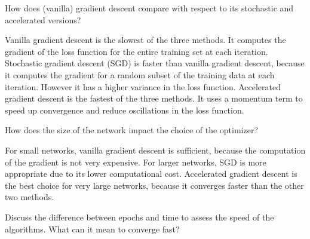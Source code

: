 \documentclass{article}
\newenvironment{task}[1]{
  \begin{tcolorbox}[
    colback=highlight!5!white,
    colframe=highlight,
    title={Task #1}
  ]
}{
  \end{tcolorbox}
}
\begin{document}
\begin{task}{1.3.2}
  How does (vanilla) gradient descent compare with respect to its stochastic and accelerated
  versions?
\end{task}

Vanilla gradient descent is the slowest of the three methods. It computes the gradient of the loss
function for the entire training set at each iteration. Stochastic gradient descent (SGD) is faster
than vanilla gradient descent, because it computes the gradient for a random subset of the training
data at each iteration. However it has a higher variance in the loss function. Accelerated gradient
descent is the fastest of the three methods. It uses a momentum term to speed up convergence and
reduce oscillations in the loss function.


\begin{task}{1.3.3}
  How does the size of the network impact the choice of the optimizer?
\end{task}

For small networks, vanilla gradient descent is sufficient, because the computation of the gradient
is not very expensive. For larger networks, SGD is more appropriate due to its lower computational
cost. Accelerated gradient descent is the best choice for very large networks, because it converges
faster than the other two methods.


\begin{task}{1.3.4}
  Discuss the difference between epochs and time to assess the speed of the algorithms. What can it
  mean to converge fast?
\end{task}
\end{document}
